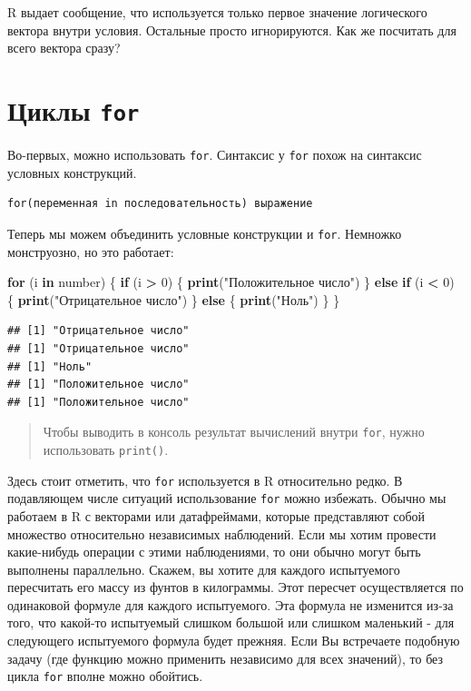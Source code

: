 \documentclass[]{book}
\newenvironment{Shaded}{\begin{snugshade}}{\end{snugshade}}
\newcommand{\KeywordTok}[1]{\textcolor[rgb]{0.13,0.29,0.53}{\textbf{#1}}}
\newcommand{\DecValTok}[1]{\textcolor[rgb]{0.00,0.00,0.81}{#1}}
\newcommand{\StringTok}[1]{\textcolor[rgb]{0.31,0.60,0.02}{#1}}
\newcommand{\ControlFlowTok}[1]{\textcolor[rgb]{0.13,0.29,0.53}{\textbf{#1}}}
\newcommand{\OperatorTok}[1]{\textcolor[rgb]{0.81,0.36,0.00}{\textbf{#1}}}
\newcommand{\NormalTok}[1]{#1}
\begin{document}
R выдает сообщение, что используется только первое значение логического
вектора внутри условия. Остальные просто игнорируются. Как же посчитать
для всего вектора сразу?

\section{\texorpdfstring{Циклы \texttt{for}}{Циклы for}}\label{for}

Во-первых, можно использовать \texttt{for}. Синтаксис у \texttt{for}
похож на синтаксис условных конструкций.

\begin{verbatim}
for(переменная in последовательность) выражение
\end{verbatim}

Теперь мы можем объединить условные конструкции и \texttt{for}. Немножко
монструозно, но это работает:

\begin{Shaded}
\begin{Highlighting}[]
\ControlFlowTok{for}\NormalTok{ (i }\ControlFlowTok{in}\NormalTok{ number) \{}
  \ControlFlowTok{if}\NormalTok{ (i }\OperatorTok{>}\StringTok{ }\DecValTok{0}\NormalTok{) \{}
    \KeywordTok{print}\NormalTok{(}\StringTok{"Положительное число"}\NormalTok{)}
\NormalTok{  \} }\ControlFlowTok{else} \ControlFlowTok{if}\NormalTok{ (i }\OperatorTok{<}\StringTok{ }\DecValTok{0}\NormalTok{) \{}
    \KeywordTok{print}\NormalTok{(}\StringTok{"Отрицательное число"}\NormalTok{)}
\NormalTok{  \} }\ControlFlowTok{else}\NormalTok{ \{}
    \KeywordTok{print}\NormalTok{(}\StringTok{"Ноль"}\NormalTok{)}
\NormalTok{  \}}
\NormalTok{\}}
\end{Highlighting}
\end{Shaded}

\begin{verbatim}
## [1] "Отрицательное число"
## [1] "Отрицательное число"
## [1] "Ноль"
## [1] "Положительное число"
## [1] "Положительное число"
\end{verbatim}

\begin{quote}
Чтобы выводить в консоль результат вычислений внутри \texttt{for}, нужно
использовать \texttt{print()}.
\end{quote}

Здесь стоит отметить, что \texttt{for} используется в R относительно
редко. В подавляющем числе ситуаций использование \texttt{for} можно
избежать. Обычно мы работаем в R с векторами или датафреймами, которые
представляют собой множество относительно независимых наблюдений. Если
мы хотим провести какие-нибудь операции с этими наблюдениями, то они
обычно могут быть выполнены параллельно. Скажем, вы хотите для каждого
испытуемого пересчитать его массу из фунтов в килограммы. Этот пересчет
осуществляется по одинаковой формуле для каждого испытуемого. Эта
формула не изменится из-за того, что какой-то испытуемый слишком большой
или слишком маленький - для следующего испытуемого формула будет
прежняя. Если Вы встречаете подобную задачу (где функцию можно применить
независимо для всех значений), то без цикла \texttt{for} вполне можно
обойтись.
\end{document}
